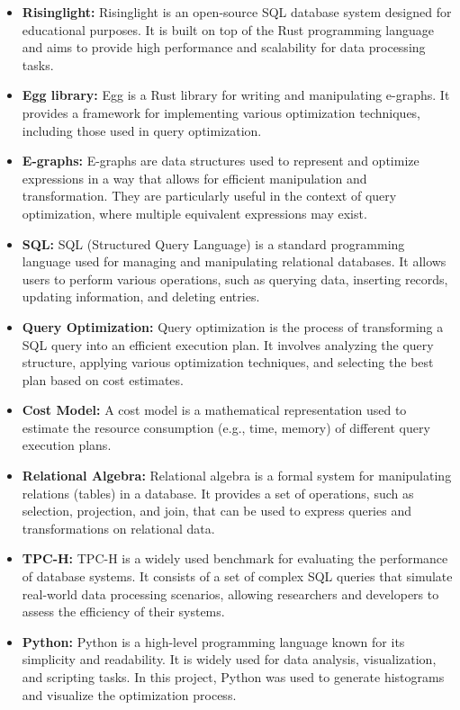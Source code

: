 \documentclass[a4paper,12pt]{scrreprt}
\begin{document}
\begin{itemize}
    \item \textbf{Risinglight:} Risinglight is an open-source SQL database system designed for educational purposes. It is built on top of the Rust programming language and aims to provide high performance and scalability for data processing tasks.
    \item \textbf{Egg library:} Egg is a Rust library for writing and manipulating e-graphs. It provides a framework for implementing various optimization techniques, including those used in query optimization.
    \item \textbf{E-graphs:} E-graphs are data structures used to represent and optimize expressions in a way that allows for efficient manipulation and transformation. They are particularly useful in the context of query optimization, where multiple equivalent expressions may exist.
    \item \textbf{SQL:} SQL (Structured Query Language) is a standard programming language used for managing and manipulating relational databases. It allows users to perform various operations, such as querying data, inserting records, updating information, and deleting entries.
    \item \textbf{Query Optimization:} Query optimization is the process of transforming a SQL query into an efficient execution plan. It involves analyzing the query structure, applying various optimization techniques, and selecting the best plan based on cost estimates.
    \item \textbf{Cost Model:} A cost model is a mathematical representation used to estimate the resource consumption (e.g., time, memory) of different query execution plans.
    \item \textbf{Relational Algebra:} Relational algebra is a formal system for manipulating relations (tables) in a database. It provides a set of operations, such as selection, projection, and join, that can be used to express queries and transformations on relational data.
    \item \textbf{TPC-H:} TPC-H is a widely used benchmark for evaluating the performance of database systems. It consists of a set of complex SQL queries that simulate real-world data processing scenarios, allowing researchers and developers to assess the efficiency of their systems.
    \item \textbf{Python:} Python is a high-level programming language known for its simplicity and readability. It is widely used for data analysis, visualization, and scripting tasks. In this project, Python was used to generate histograms and visualize the optimization process.

\end{itemize}
\end{document}
